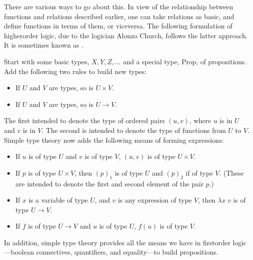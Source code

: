 \documentclass[letterpaper,10pt,english]{sphinxmanual}
\begin{document}
\sphinxAtStartPar
There are various ways to go about this. In view of the relationship between functions and relations described earlier, one can take relations as basic, and define functions in terms of them, or vice\sphinxhyphen{}versa. The following formulation of higher\sphinxhyphen{}order logic, due to the logician Alonzo Church, follows the latter approach. It is sometimes known as .

\sphinxAtStartPar
Start with some basic types, \(X, Y, Z, \ldots\) and a special type, \(\mathrm{Prop}\), of propositions. Add the following two rules to build new types:
\begin{itemize}
\item {} 
\sphinxAtStartPar
If \(U\) and \(V\) are types, so is \(U \times V\).

\item {} 
\sphinxAtStartPar
If \(U\) and \(V\) are types, so is \(U \to V\).

\end{itemize}

\sphinxAtStartPar
The first intended to denote the type of ordered pairs \((u, v)\), where \(u\) is in \(U\) and \(v\) is in \(V\). The second is intended to denote the type of functions from \(U\) to \(V\). Simple type theory now adds the following means of forming expressions:
\begin{itemize}
\item {} 
\sphinxAtStartPar
If \(u\) is of type \(U\) and \(v\) is of type \(V\), \((u, v)\) is of type \(U \times V\).

\item {} 
\sphinxAtStartPar
If \(p\) is of type \(U \times V\), then \((p)_1\) is of type \(U\) and \((p)_2\) if of type \(V\). (These are intended to denote the first and second element of the pair \(p\).)

\item {} 
\sphinxAtStartPar
If \(x\) is a variable of type \(U\), and \(v\) is any expression of type \(V\), then \(\lambda x \; v\) is of type \(U \to V\).

\item {} 
\sphinxAtStartPar
If \(f\) is of type \(U \to V\) and \(u\) is of type \(U\), \(f(u)\) is of type \(V\).

\end{itemize}

\sphinxAtStartPar
In addition, simple type theory provides all the means we have in first\sphinxhyphen{}order logic—boolean connectives, quantifiers, and equality—to build propositions.
\end{document}
